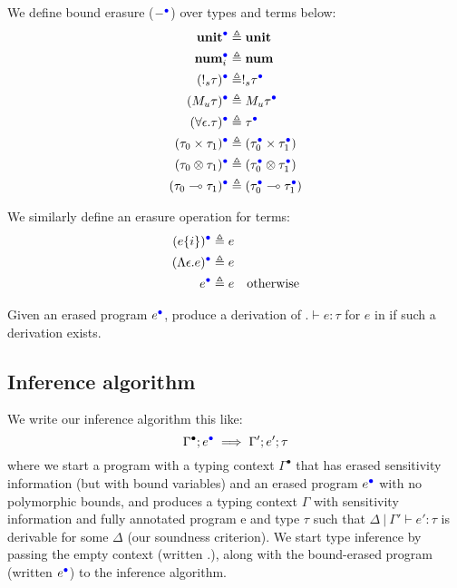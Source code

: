 \begin{definition}
We define bound erasure ($-^{\textcolor{blue}{\bullet}}$) over types and terms below:
\begin{equation}
\begin{aligned}[c]
\textbf{unit}^{\textcolor{blue}{\bullet}} &\triangleq \textbf{unit} \\
\textbf{num}_i^{\textcolor{blue}{\bullet}} &\triangleq \textbf{num} \\
(!_s \tau)^{\textcolor{blue}{\bullet}} &\triangleq !_s \tau^{\textcolor{blue}{\bullet}} \\
(M_u \tau)^{\textcolor{blue}{\bullet}} &\triangleq M_u \tau^{\textcolor{blue}{\bullet}} \\
(\forall \epsilon . \tau)^{\textcolor{blue}{\bullet}} &\triangleq \tau^{\textcolor{blue}{\bullet}} \\
(\tau_0 \times \tau_1)^{\textcolor{blue}{\bullet}} &\triangleq (\tau_0^{\textcolor{blue}{\bullet}} \times \tau_1^{\textcolor{blue}{\bullet}}) \\
(\tau_0 \otimes \tau_1)^{\textcolor{blue}{\bullet}} &\triangleq (\tau_0^{\textcolor{blue}{\bullet}} \otimes \tau_1^{\textcolor{blue}{\bullet}}) \\
(\tau_0 \multimap \tau_1)^{\textcolor{blue}{\bullet}} &\triangleq (\tau_0^{\textcolor{blue}{\bullet}} \multimap \tau_1^{\textcolor{blue}{\bullet}}) \\
\end{aligned}
\end{equation}

We similarly define an erasure operation for terms:
\begin{equation}
\begin{aligned}[c]
(e \{ i \})^{\textcolor{blue}{\bullet}} &\triangleq e  \\
(\Lambda \epsilon . e)^{\textcolor{blue}{\bullet}} &\triangleq e \\
e^{\textcolor{blue}{\bullet}} &\triangleq e &\text{otherwise} 
\end{aligned}
\end{equation}
\end{definition}

\begin{definition}
Given an erased program $e^{\textcolor{blue}{\bullet}}$, produce a derivation of $. \vdash e
: \tau$ for $e$ in \Lang if such a derivation exists. 
\end{definition}

\subsection{Inference algorithm}
We write our inference algorithm this like:
$$\Gamma^{\bullet}; e^{\textcolor{blue}{\bullet}} \implies \Gamma'; e'; \tau$$
where we start a program with a typing context $\Gamma^{\bullet}$ that has
erased sensitivity information (but with bound variables) and an erased program
$e^{\textcolor{blue}{\bullet}}$ with no polymorphic bounds, and produces a typing context
$\Gamma$ with sensitivity information and fully annotated program e and type
$\tau$ such that
$\Delta \ | \ \Gamma' \vdash e' : \tau$
is derivable for some $\Delta$ (our soundness criterion). We start type
inference by passing the empty context (written .), along with the bound-erased
program (written $e^{\textcolor{blue}{\bullet}}$) to the inference algorithm.

